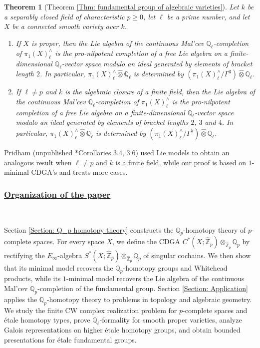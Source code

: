 \documentclass[11pt]{amsart}
\newtheorem{theorem}{Theorem}[section]
\theoremstyle{definition}
\numberwithin{equation}{section}
\numberwithin{equation}{section}
\newcommand\QQ{\mathbb{Q}}
\newcommand\ZZ{\mathbb{Z}}
\DeclareMathOperator{\et}{\acute{e}t}
\begin{document}
\begin{theorem}[Theorem \ref{Thm: fundamental group of algebraic varieties}]
Let $k$ be a separably closed field of characteristic $p\geq 0$, let $\ell$ be a prime number, and let $X$ be a connected smooth variety over $k$. 
\begin{enumerate}[leftmargin=0.25in]
    \item If $X$ is proper, then the Lie algebra of the continuous Mal'cev $\QQ_{\ell}$-completion of  $\pi_1^{\et}(X)^{\wedge}_{\ell}$ is the pro-nilpotent completion of a free Lie algebra on a finite-dimensional $\QQ_{\ell}$-vector space modulo an ideal generated by elements of bracket length $2$. In particular, $\pi_1^{\et}(X)^{\wedge}_{\ell}\widehat{\otimes }\QQ_{\ell}$ is determined by $(\pi_1^{\et}(X)^{\wedge}_{\ell}/\Gamma^3)\widehat{\otimes}\QQ_{\ell}$.
    \item If $\ell\neq p$ and $k$ is the algebraic closure of a finite field, then the Lie algebra of the continuous Mal'cev $\QQ_{\ell}$-completion of $\pi_1^{\et}(X)^{\wedge}_{\ell}$ is the pro-nilpotent completion of a free Lie algebra on a finite-dimensional $\QQ_{\ell}$-vector space modulo an ideal generated by elements of bracket lengths $2$, $3$ and $4$. In particular, $\pi_1^{\et}(X)^{\wedge}_{\ell}\widehat{\otimes }\QQ_{\ell}$ is determined by $(\pi_1^{\et}(X)^{\wedge}_{\ell}/\Gamma^5)\widehat{\otimes}\QQ_{\ell}$.
\end{enumerate}
\end{theorem}

Pridham (unpublished \cite{Pridham-etale-fundamental-group-of-smooth-variety}*{Corollaries 3.4, 3.6}) used Lie models to obtain an analogous result when $\ell\neq p$ and $k$ is a finite field, while our proof is based on $1$-minimal CDGA's and treats more cases.

\subsubsection*{\underline{Organization of the paper}}\,

Section \ref{Section: Q_p homotopy theory} constructs the $\mathbb Q_p$-homotopy theory of $p$-complete spaces.
For every space $X$, we define the CDGA $C^*(X;\widehat{\ZZ}_p)
\otimes_{\widehat{\ZZ}_p}\QQ_p$ by rectifying the $E_{\infty}$-algebra $S^*(X;\widehat{\ZZ}_p)
\otimes_{\widehat{\ZZ}_p}\QQ_p$ of singular cochains. We then show that its minimal model recovers the $\QQ_p$-homotopy groups and
Whitehead products, while its $1$-minimal model recovers the Lie algebra of the continuous Mal'cev $\QQ_p$-completion of the fundamental group. Section \ref{Section: Application} applies the $\QQ_p$-homotopy theory to problems in topology and algebraic geometry. We study the finite CW complex realization problem for $p$-complete spaces and \'etale homotopy types, prove $\QQ_{\ell}$-formality for smooth proper varieties, analyze Galois representations on higher \'etale homotopy groups, and obtain bounded presentations for \'etale fundamental groups.
\end{document}
